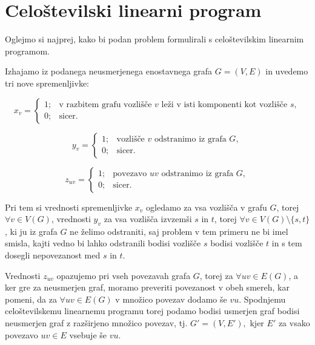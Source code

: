 \documentclass[a4paper,12pt]{article}
\theoremstyle{definition}
\begin{document}
\section{Celoštevilski linearni program}

Oglejmo si najprej, kako bi podan problem formulirali s celoštevilskim 
linearnim programom.

Izhajamo iz podanega neusmerjenega enostavnega grafa $G = (V, E)$ in 
uvedemo tri nove spremenljivke:

\begin{displaymath}
	x_{v} = \left\{
		\begin{array}{ll}
			1; &\text{v razbitem grafu vozlišče } v
			\text{ leži v isti komponenti kot vozlišče }s, \\
			0; &\text{sicer}.
		\end{array}\right.
\end{displaymath}

\begin{displaymath}
	y_{v} = \left\{
		\begin{array}{ll}
			1; &\text{vozlišče } v \text{ odstranimo iz grafa }G, \\
			0; &\text{sicer}.
		\end{array}\right.
\end{displaymath}

\begin{displaymath}
	z_{uv} = \left\{
		\begin{array}{ll}
			1; &\text{povezavo } uv \text{ odstranimo iz grafa }G, \\
			0; &\text{sicer}.
		\end{array}\right.
\end{displaymath}

Pri tem si vrednosti spremenljivke $x_v$ ogledamo za vsa vozlišča v grafu $G$, torej 
$\forall{v} \in V(G)$, vrednosti $y_v$ za vsa vozlišča izvzemši $s$ in $t$,
torej $\forall{v} \in V(G)\setminus \{s, t\}$, ki ju iz grafa $G$ ne želimo odstraniti, saj problem v tem primeru
ne bi imel smisla, kajti vedno bi lahko odstranili bodisi 
vozlišče $s$ bodisi vozlišče $t$ in s tem dosegli nepovezanost med $s$ in $t$.

Vrednosti $z_{uv}$ opazujemo pri vseh povezavah grafa $G$,
torej za $\forall uv \in E(G)$, a ker gre za neusmerjen graf, moramo preveriti 
povezanost v obeh smereh, kar pomeni, da za $\forall uv \in E(G)$ v množico povezav
dodamo še $vu$. Spodnjemu celoštevilskemu linearnemu programu torej podamo
bodisi usmerjen graf bodisi neusmerjen graf z razširjeno množico povezav, 
tj. $G' = (V, E'),$ kjer $E'$ za vsako povezavo $uv \in E$ vsebuje še $vu$.\\
\end{document}
